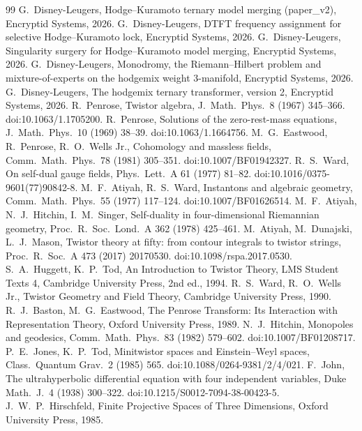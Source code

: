 \documentclass[10pt]{article}
\theoremstyle{definition}
\begin{document}
\begin{thebibliography}{99}\small
{} G.~Disney-Leugers, Hodge--Kuramoto ternary model merging (paper\_v2), Encryptid Systems, 2026.
 G.~Disney-Leugers, DTFT frequency assignment for selective Hodge--Kuramoto lock, Encryptid Systems, 2026.
 G.~Disney-Leugers, Singularity surgery for Hodge--Kuramoto model merging, Encryptid Systems, 2026.
 G.~Disney-Leugers, Monodromy, the Riemann--Hilbert problem and mixture-of-experts on the hodgemix weight 3-manifold, Encryptid Systems, 2026.
 G.~Disney-Leugers, The hodgemix ternary transformer, version 2, Encryptid Systems, 2026.
 R.~Penrose, Twistor algebra, J.\ Math.\ Phys.\ 8 (1967) 345--366. doi:10.1063/1.1705200.
 R.~Penrose, Solutions of the zero-rest-mass equations, J.\ Math.\ Phys.\ 10 (1969) 38--39. doi:10.1063/1.1664756.
 M.~G.~Eastwood, R.~Penrose, R.~O.~Wells Jr., Cohomology and massless fields, Comm.\ Math.\ Phys.\ 78 (1981) 305--351. doi:10.1007/BF01942327.
 R.~S.~Ward, On self-dual gauge fields, Phys.\ Lett.\ A 61 (1977) 81--82. doi:10.1016/0375-9601(77)90842-8.
 M.~F.~Atiyah, R.~S.~Ward, Instantons and algebraic geometry, Comm.\ Math.\ Phys.\ 55 (1977) 117--124. doi:10.1007/BF01626514.
 M.~F.~Atiyah, N.~J.~Hitchin, I.~M.~Singer, Self-duality in four-dimensional Riemannian geometry, Proc.\ R.\ Soc.\ Lond.\ A 362 (1978) 425--461.
 M.~Atiyah, M.~Dunajski, L.~J.~Mason, Twistor theory at fifty: from contour integrals to twistor strings, Proc.\ R.\ Soc.\ A 473 (2017) 20170530. doi:10.1098/rspa.2017.0530.
 S.~A.~Huggett, K.~P.~Tod, An Introduction to Twistor Theory, LMS Student Texts 4, Cambridge University Press, 2nd ed., 1994.
 R.~S.~Ward, R.~O.~Wells Jr., Twistor Geometry and Field Theory, Cambridge University Press, 1990.
 R.~J.~Baston, M.~G.~Eastwood, The Penrose Transform: Its Interaction with Representation Theory, Oxford University Press, 1989.
 N.~J.~Hitchin, Monopoles and geodesics, Comm.\ Math.\ Phys.\ 83 (1982) 579--602. doi:10.1007/BF01208717.
 P.~E.~Jones, K.~P.~Tod, Minitwistor spaces and Einstein--Weyl spaces, Class.\ Quantum Grav.\ 2 (1985) 565. doi:10.1088/0264-9381/2/4/021.
 F.~John, The ultrahyperbolic differential equation with four independent variables, Duke Math.\ J.\ 4 (1938) 300--322. doi:10.1215/S0012-7094-38-00423-5.
 J.~W.~P.~Hirschfeld, Finite Projective Spaces of Three Dimensions, Oxford University Press, 1985.

\end{thebibliography}
\end{document}
